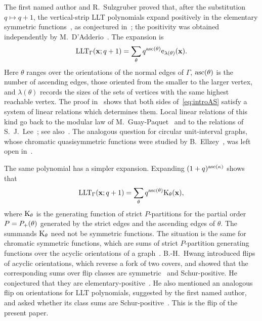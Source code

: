 The first named author and R.~Sulzgruber proved that, after the substitution
$q\mapsto q+1$, the vertical-strip LLT polynomials expand positively in the
elementary symmetric functions~\cite{AlexanderssonSulzgruber2022}, as conjectured
in~\cite{GarsiaHaglundQiuRomero2019,Alexandersson2019llt}; the positivity was
obtained independently by M.~D'Adderio~\cite{DAdderio2020}.
The expansion is
\begin{equation}\label{eq:introAS}
 \operatorname{LLT}_\Gamma(\mathbf{x};q+1)=\sum_{\theta}q^{\operatorname{asc}(\theta)}\mathrm{e}_{\lambda(\theta)}(\mathbf{x}).
\end{equation}
Here $\theta$ ranges over the orientations of the normal edges of $\Gamma$,
$\operatorname{asc}(\theta)$ is the number of ascending edges, those oriented from the smaller
to the larger vertex, and $\lambda(\theta)$ records the sizes of the sets of vertices with the same highest reachable vertex.
The proof in~\cite{AlexanderssonSulzgruber2022} shows that both sides
of~\eqref{eq:introAS} satisfy a system of linear relations which determines them.
Local linear relations of this kind go back to the modular law of
M.~Guay-Paquet~\cite{GuayPaquet2013} and to the relations of
S.~J.~Lee~\cite{Lee2018x}; see also~\cite{AbreuNigro2020ax}.
The analogous question for circular unit-interval graphs, whose chromatic
quasisymmetric functions were studied by B.~Ellzey~\cite{Ellzey2016,Ellzey2017},
was left open in~\cite[Sec.~6.8]{AlexanderssonSulzgruber2022}.

The same polynomial has a simpler expansion.
Expanding $(1+q)^{\operatorname{asc}(\kappa)}$ shows that
\begin{equation}\label{eq:introK}
 \operatorname{LLT}_\Gamma(\mathbf{x};q+1)=\sum_{\theta}q^{\operatorname{asc}(\theta)}\mathrm{K}_{\theta}(\mathbf{x}),
\end{equation}
where $\mathrm{K}_\theta$ is the generating function of strict $P$-partitions for the
partial order $P=P_{+}(\theta)$ generated by the strict edges and the ascending
edges of $\theta$.
The summands $\mathrm{K}_{\theta}$ need not be symmetric functions.
The situation is the same for chromatic symmetric functions, which are sums of
strict $P$-partition generating functions over the acyclic orientations of a
graph~\cite{Stanley1995}.
B.-H.~Hwang introduced flips of acyclic orientations, which reverse a fork of two
covers, and showed that the corresponding sums over flip classes are
symmetric~\cite[Thm.~3.8]{Hwang2022x} and Schur-positive.
He conjectured that they are elementary-positive~\cite[Conj.~3.10]{Hwang2022x}.
He also mentioned an analogous flip on orientations for LLT polynomials,
suggested by the first named author, and asked whether its class sums are
Schur-positive~\cite[Sec.~5.3]{Hwang2022x}.
This is the flip of the present paper.

